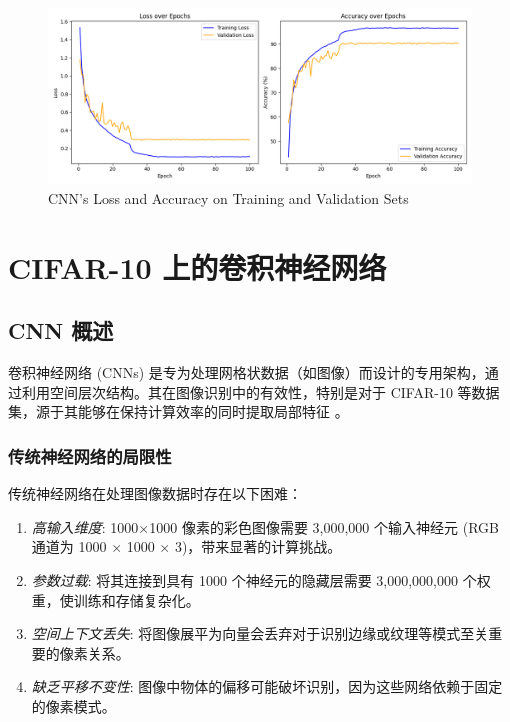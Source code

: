 \documentclass[UTF8]{report}
\theoremstyle{MyLineTheoremStyle} %
\theoremstyle{MyBlockTheoremStyle} %
\theoremstyle{MySubsubsectionStyle} %
\begin{document}
\begin{figure}[H]
    \centering
    \includegraphics[width=1.0\textwidth]{train3.png}
    \caption{CNN's Loss and Accuracy on Training and Validation Sets}
    \label{fig:cnn_training_validation_loss_accuracy}
\end{figure}







\cleardoublepage



\section{CIFAR-10 上的卷积神经网络}

\subsection{CNN 概述}

卷积神经网络 (CNNs) 是专为处理网格状数据（如图像）而设计的专用架构，通过利用空间层次结构。其在图像识别中的有效性，特别是对于 CIFAR-10 等数据集，源于其能够在保持计算效率的同时提取局部特征 \cite{cifar10}。

\subsubsection{传统神经网络的局限性}

传统神经网络在处理图像数据时存在以下困难：

\begin{enumerate}[label=\roman*.]
    \item \textit{高输入维度}: 1000$\times$1000 像素的彩色图像需要 3,000,000 个输入神经元 (RGB 通道为 1000 $\times$ 1000 $\times$ 3)，带来显著的计算挑战。
    \item \textit{参数过载}: 将其连接到具有 1000 个神经元的隐藏层需要 3,000,000,000 个权重，使训练和存储复杂化。
    \item \textit{空间上下文丢失}: 将图像展平为向量会丢弃对于识别边缘或纹理等模式至关重要的像素关系。
    \item \textit{缺乏平移不变性}: 图像中物体的偏移可能破坏识别，因为这些网络依赖于固定的像素模式。
\end{enumerate}
\end{document}
